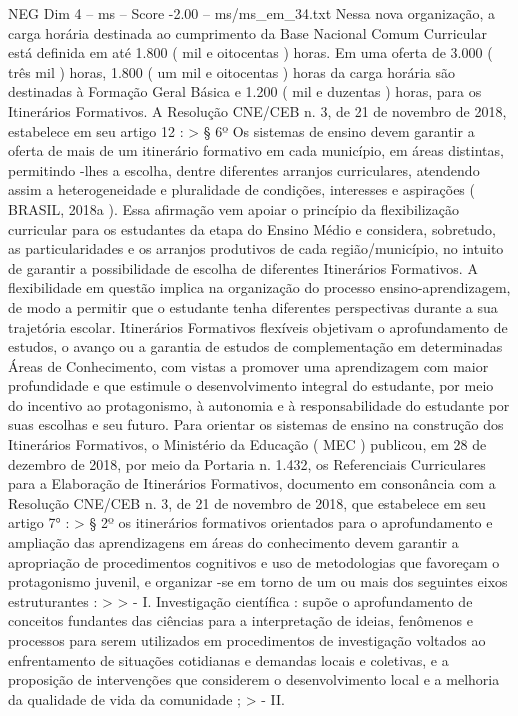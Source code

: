 \begin{textsample}{NEG Dim 4 – ms – Score -2.00 – ms/ms\_em\_34.txt}
Nessa nova organização, a carga horária destinada ao cumprimento da Base Nacional Comum Curricular está definida em até 1.800 ( mil e oitocentas ) horas.
Em uma oferta de 3.000 ( três mil ) horas, 1.800 ( um mil e oitocentas ) horas da carga horária são destinadas à Formação Geral Básica e 1.200 ( mil e duzentas ) horas, para os Itinerários Formativos.
A Resolução CNE/CEB n. 3, de 21 de novembro de 2018, estabelece em seu artigo 12 : > § 6º Os sistemas de ensino devem garantir a oferta de mais de um itinerário formativo em cada município, em áreas distintas, permitindo -lhes a escolha, dentre diferentes arranjos curriculares, atendendo assim a heterogeneidade e pluralidade de condições, interesses e aspirações ( BRASIL, 2018a ).
Essa afirmação vem apoiar o princípio da flexibilização curricular para os estudantes da etapa do Ensino Médio e considera, sobretudo, as particularidades e os arranjos produtivos de cada região/município, no intuito de garantir a possibilidade de escolha de diferentes Itinerários Formativos.
A flexibilidade em questão implica na organização do processo ensino-aprendizagem, de modo a permitir que o estudante tenha diferentes perspectivas durante a sua trajetória escolar.
Itinerários Formativos flexíveis objetivam o aprofundamento de estudos, o avanço ou a garantia de estudos de complementação em determinadas Áreas de Conhecimento, com vistas a promover uma aprendizagem com maior profundidade e que estimule o desenvolvimento integral do estudante, por meio do incentivo ao protagonismo, à autonomia e à responsabilidade do estudante por suas escolhas e seu futuro.
Para orientar os sistemas de ensino na construção dos Itinerários Formativos, o Ministério da Educação ( MEC ) publicou, em 28 de dezembro de 2018, por meio da Portaria n. 1.432, os Referenciais Curriculares para a Elaboração de Itinerários Formativos, documento em consonância com a Resolução CNE/CEB n. 3, de 21 de novembro de 2018, que estabelece em seu artigo 7{\EmojiFont °} : > § 2º os itinerários formativos orientados para o aprofundamento e ampliação das aprendizagens em áreas do conhecimento devem garantir a apropriação de procedimentos cognitivos e uso de metodologias que favoreçam o protagonismo juvenil, e organizar -se em torno de um ou mais dos seguintes eixos estruturantes : > > - I.
Investigação científica : supõe o aprofundamento de conceitos fundantes das ciências para a interpretação de ideias, fenômenos e processos para serem utilizados em procedimentos de investigação voltados ao enfrentamento de situações cotidianas e demandas locais e coletivas, e a proposição de intervenções que considerem o desenvolvimento local e a melhoria da qualidade de vida da comunidade ; > - II.

\end{textsample}
